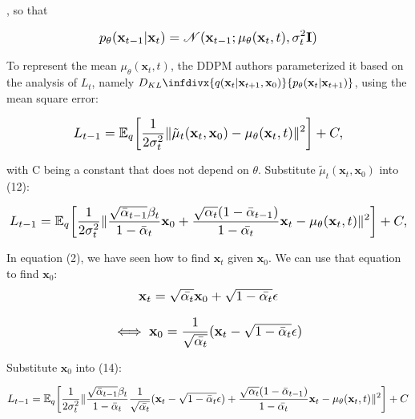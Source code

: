 \documentclass{article}
\newcommand{\infdiv}{D_{KL}\infdivx}
\newcommand*{\Scale}[2][4]{\scalebox{#1}{\ensuremath{#2}}}
\begin{document}
, so that

\begin{equation}
\Scale[1.2]{ \displaystyle
 p_\theta(\textbf{x}_{t-1}|\textbf{x}_{t}) = \mathscr{N}(\textbf{x}_{t-1};\mu_\theta(\textbf{x}_{t},t),\sigma_t^2 \textbf{I}) }
\end{equation}

To represent the mean $ \mu_\theta(\textbf{x}_{t},t) $, the DDPM authors parameterized it based on the analysis of $ L_t $, namely $
\infdiv{ 
q(\textbf{x}_{t}|\textbf{x}_{t+1},\textbf{x}_0)
}
{
p_\theta(\textbf{x}_{t}|\textbf{x}_{t+1})
}
$, using the mean square error:

\begin{equation}
\Scale[1.2]{ \displaystyle
L_{t-1} = \mathbb{E}_{q} \left[ 
\frac{1}{2\sigma_t^2}
\norm{
\tilde{\mu}_t(\textbf{x}_{t},\textbf{x}_0) - \mu_\theta(\textbf{x}_{t},t)
}^2
\right] + C, }
\end{equation}

with C being a constant that does not depend on $ \theta $. Substitute $ \tilde{\mu}_t(\textbf{x}_{t},\textbf{x}_0) $ into (12):

\begin{equation}
\Scale[1.2]{ \displaystyle
L_{t-1} = \mathbb{E}_{q} \left[ 
\frac{1}{2\sigma_t^2}
\norm{
\frac{
\sqrt{\bar{\alpha}_{t-1}}\beta_t
}
{
1 - \bar{\alpha}_t
}
\textbf{x}_0 
+
\frac{
\sqrt{\alpha_{t}}(1-\bar{\alpha}_{t-1})
}
{
1 - \bar{\alpha_t}
}
\textbf{x}_t 
-
 \mu_\theta(\textbf{x}_{t},t)
}^2
\right] + C, }
\end{equation}

In equation (2), we have seen how to find $ \textbf{x}_t $ given $ \textbf{x}_0 $. We can use that equation to find $ \textbf{x}_0 $:
\begin{equation}
\Scale[1.2]{ \displaystyle
\textbf{x}_t = \sqrt{\bar{\alpha_t}} \textbf{x}_{0} + \sqrt{1-\bar{\alpha_t}} \epsilon}
\end{equation}

\begin{equation}
\Scale[1.2]{ \displaystyle
\iff \textbf{x}_0 = \frac{1}{\sqrt{\bar{\alpha_t}}}(\textbf{x}_{t} - \sqrt{1-\bar{\alpha}_t} \epsilon) }
\end{equation}

Substitute $ \textbf{x}_0 $ into (14):

\begin{equation}
\Scale[1.2]{ \displaystyle
L_{t-1} = \mathbb{E}_{q} \left[ 
\frac{1}{2\sigma_t^2}
\norm{
\frac{
\sqrt{\bar{\alpha}_{t-1}}\beta_t
}
{
1 - \bar{\alpha}_t
}
\frac{1}{\sqrt{\bar{\alpha_t}}}(\textbf{x}_{t} - \sqrt{1-\bar{\alpha}_t} \epsilon)
+
\frac{
\sqrt{\alpha_{t}}(1-\bar{\alpha}_{t-1})
}
{
1 - \bar{\alpha_t}
}
\textbf{x}_t 
-
\mu_\theta(\textbf{x}_{t},t)
}^2
\right] + C }
\end{equation}
\end{document}
